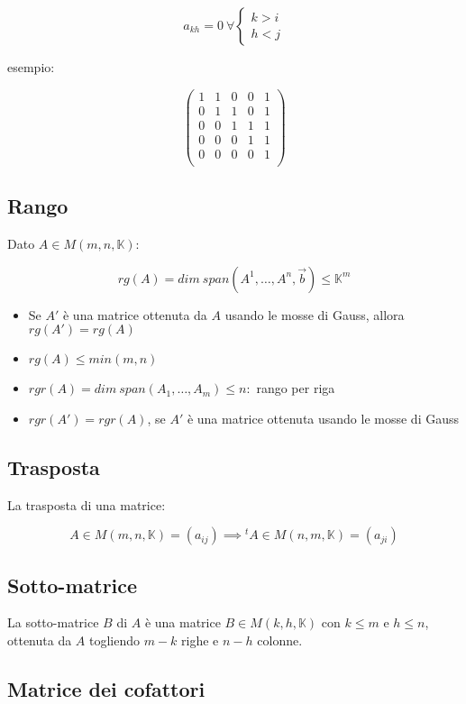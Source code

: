 \documentclass{subfiles}
\begin{document}
$$
a_{kh} = 0\ \forall
\begin{cases}
k > i\\
h < j
\end{cases}
$$

\noindent
esempio:

$$
\begin{pmatrix}
1 & 1 & 0 & 0 & 1\\
0 & 1 & 1 & 0 & 1\\
0 & 0 & 1 & 1 & 1\\
0 & 0 & 0 & 1 & 1\\
0 & 0 & 0 & 0 & 1\\
\end{pmatrix}
$$

\subsection{Rango}

Dato $A \in M(m,n,\mathbb{K})$:

$$
rg(A)= dim\ span(A^1, \dots, A^n, \vec{b}) \leq \mathbb{K}^m
$$

\begin{itemize}
    \item Se $A'$ è una matrice ottenuta da $A$ usando le mosse di Gauss, allora $rg(A') = rg(A)$
    \item $rg(A) \leq min(m,n)$
    \item $rgr(A) = dim\ span(A_1, \dots, A_m) \leq n :$ rango per riga
    \item $rgr(A') = rgr(A)$, se $A'$ è una matrice ottenuta usando le mosse di Gauss
\end{itemize}

\subsection{Trasposta}

La trasposta di una matrice:

$$
A \in M(m,n,\mathbb{K}) = (a_{ij}) \implies {}^tA \in M(n,m,\mathbb{K}) = (a_{ji})
$$

\subsection{Sotto-matrice}

La sotto-matrice $B$ di $A$ è una matrice $B \in M(k,h,\mathbb{K})$ con $k \leq m$ e $h \leq n$, ottenuta da $A$ togliendo $m - k$ righe e $n - h$ colonne.

\subsection{Matrice dei cofattori}
\end{document}
